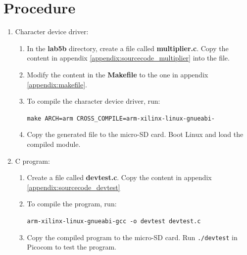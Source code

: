 \documentclass[11pt,letterpaper,titlepage]{article}
\begin{document}
\part{Procedure}

\begin{enumerate}
    
    \item Character device driver:
    
    \begin{enumerate}
        
        \item In the \textbf{lab5b} directory, create a file called \textbf{multiplier.c}. Copy the content in appendix \ref{appendix:sourcecode_multiplier} into the file.
        
        \item Modify the content in the \textbf{Makefile} to the one in appendix \ref{appendix:makefile}.
        
        \item To compile the character device driver, run:
        
        \verb|make ARCH=arm CROSS_COMPILE=arm-xilinx-linux-gnueabi-|
        
        \item Copy the generated file to the micro-SD card. Boot Linux and load the compiled module.
        
    \end{enumerate}
    
    \item C program:
    
    \begin{enumerate}
        
        \item Create a file called \textbf{devtest.c}. Copy the content in appendix \ref{appendix:sourcecode_devtest}
        
        \item To compile the program, run:
        
        \verb|arm-xilinx-linux-gnueabi-gcc -o devtest devtest.c|
        
        \item Copy the compiled program to the micro-SD card. Run \verb|./devtest| in Picocom to test the program.
        
    \end{enumerate}
    
\end{enumerate}
\end{document}
